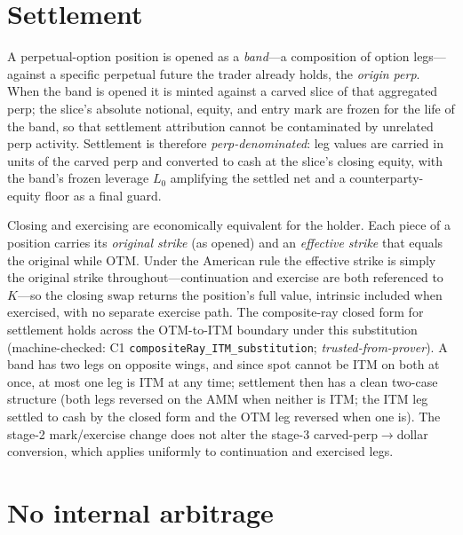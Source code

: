 \documentclass[runningheads]{llncs}
\newcommand{\tfp}{\emph{trusted-from-prover}}
\begin{document}
\section{Settlement}\label{sec:settlement}

A perpetual-option position is opened as a \emph{band}---a composition of option
legs---against a specific perpetual future the trader already holds, the
\emph{origin perp}. When the band is opened it is minted against a carved slice of
that aggregated perp; the slice's absolute notional, equity, and entry mark are
frozen for the life of the band, so that settlement attribution cannot be
contaminated by unrelated perp activity. Settlement is therefore
\emph{perp-denominated}: leg values are carried in units of the carved perp and
converted to cash at the slice's closing equity, with the band's frozen leverage
$L_{0}$ amplifying the settled net and a counterparty-equity floor as a final
guard.

Closing and exercising are economically equivalent for the holder. Each piece of
a position carries its \emph{original strike} (as opened) and an \emph{effective
strike} that equals the original while OTM. Under the American rule the effective
strike is simply the original strike throughout---continuation and exercise are
both referenced to $K$---so the closing swap returns the position's full value,
intrinsic included when exercised, with no separate exercise path. The
composite-ray closed form for settlement holds across the OTM-to-ITM boundary
under this substitution (machine-checked: C1
\texttt{compositeRay\_ITM\_substitution}; \tfp{}). A band has two legs on opposite
wings, and since spot cannot be ITM on both at once, at most one leg is ITM at any
time; settlement then has a clean two-case structure (both legs reversed on the
AMM when neither is ITM; the ITM leg settled to cash by the closed form and the
OTM leg reversed when one is). The stage-2 mark/exercise change does not alter the
stage-3 carved-perp$\to$dollar conversion, which applies uniformly to continuation
and exercised legs.

\section{No internal arbitrage}\label{sec:noarb}
\end{document}

